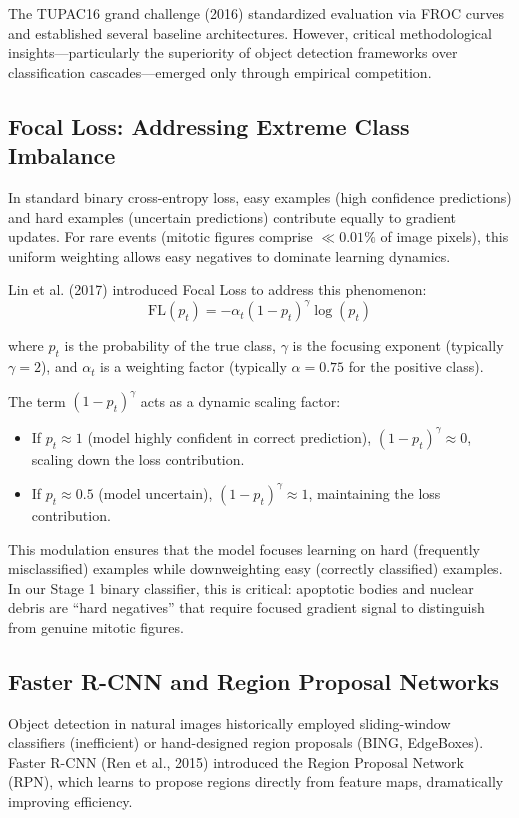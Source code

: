 \documentclass[journal]{IEEEtran}
\begin{document}
The TUPAC16 grand challenge (2016) standardized evaluation via FROC curves and established several baseline architectures. However, critical methodological insights---particularly the superiority of object detection frameworks over classification cascades---emerged only through empirical competition.

\subsection{Focal Loss: Addressing Extreme Class Imbalance}
In standard binary cross-entropy loss, easy examples (high confidence predictions) and hard examples (uncertain predictions) contribute equally to gradient updates. For rare events (mitotic figures comprise $\ll 0.01\%$ of image pixels), this uniform weighting allows easy negatives to dominate learning dynamics.

Lin et al. (2017) introduced Focal Loss to address this phenomenon:
\begin{equation}
\text{FL}(p_t) = -\alpha_t (1-p_t)^{\gamma} \log(p_t)
\end{equation}

where $p_t$ is the probability of the true class, $\gamma$ is the focusing exponent (typically $\gamma = 2$), and $\alpha_t$ is a weighting factor (typically $\alpha = 0.75$ for the positive class).

The term $(1-p_t)^{\gamma}$ acts as a dynamic scaling factor:
\begin{itemize}
\item If $p_t \approx 1$ (model highly confident in correct prediction), $(1-p_t)^{\gamma} \approx 0$, scaling down the loss contribution.
\item If $p_t \approx 0.5$ (model uncertain), $(1-p_t)^{\gamma} \approx 1$, maintaining the loss contribution.
\end{itemize}

This modulation ensures that the model focuses learning on hard (frequently misclassified) examples while downweighting easy (correctly classified) examples. In our Stage 1 binary classifier, this is critical: apoptotic bodies and nuclear debris are ``hard negatives'' that require focused gradient signal to distinguish from genuine mitotic figures.

\subsection{Faster R-CNN and Region Proposal Networks}
Object detection in natural images historically employed sliding-window classifiers (inefficient) or hand-designed region proposals (BING, EdgeBoxes). Faster R-CNN (Ren et al., 2015) introduced the Region Proposal Network (RPN), which learns to propose regions directly from feature maps, dramatically improving efficiency.
\end{document}
